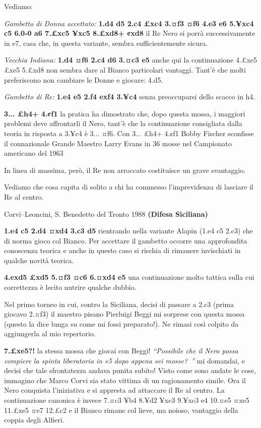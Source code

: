 Vediamo:

\emph{Gambetto di Donna accettato:} \textbf{1.d4 d5 2.c4 £xc4 3.¤f3 ¤f6
4.e3 e6 5.¥xc4 c5 6.0-0 a6 7.£xc5 ¥xc5 8.£xd8+ ¢xd8} il Re Nero si porrà
successivamente in e7, casa che, in questa variante, sembra
sufficientemente sicura.

\emph{Vecchia Indiana:} \textbf{1.d4 ¤f6 2.c4 d6 3.¤c3 e5} anche qui la
continuazione 4.£xe5 £xe5 5.£xd8 non sembra dare al Bianco particolari
vantaggi. Tant'è che molti preferiscono non cambiare le Donne e giocare:
4.d5.

\emph{Gambetto di Re:} \textbf{1.e4 e5 2.f4 exf4 3.¥c4} senza
preoccuparsi dello scacco in h4.

\textbf{3... £h4+ 4.¢f1} la pratica ha dimostrato che, dopo questa
mossa, i maggiori problemi deve affrontarli il Nero, tant'è che la
continuazione consigliata dalla teoria in risposta a 3.¥c4 è 3... ¤f6.
Con 3... £h4+ 4.¢f1 Bobby Fischer sconfisse il connazionale Grande
Maestro Larry Evans in 36 mosse nel Campionato americano del 1963

In linea di massima, però, il Re non arroccato costituisce un grave
svantaggio.

Vediamo che cosa capita di solito a chi ha commesso l'imprevidenza di
lasciare il Re al centro.

Corvi--Leoncini, S. Benedetto del Tronto 1988 \textbf{(Difesa
Siciliana)}

\textbf{1.e4 c5 2.d4 ¤xd4 3.c3 d5} rientrando nella variante Alapin
(1.e4 c5 2.c3) che di norma gioco col Bianco. Per accettare il gambetto
occorre una approfondita conoscenza teorica e anche in questo caso si
rischia di rimanere invischiati in qualche novità teorica.

\textbf{4.exd5 £xd5 5.¤f3 ¤c6 6.¤xd4 e5} una continuazione molto tattica
sulla cui correttezza è lecito nutrire qualche dubbio.

Nel primo torneo in cui, contro la Siciliana, decisi di passare a 2.c3
(prima giocavo 2.¤f3) il maestro pisano Pierluigi Beggi mi sorprese con
questa mossa (questo la dice lunga su come mi fossi preparato!). Ne
rimasi così colpito da aggiungerla al mio repertorio.

\textbf{7.£xe5?!} la stessa mossa che giocai con Beggi!
\emph{``Possibile che il Nero possa compiere la spinta liberatoria in e5
dopo appena sei mosse?~''} mi domandai, e decisi che tale sfrontatezza
andava punita subito! Visto come sono andate le cose, immagino che Marco
Corvi sia stato vittima di un ragionamento simile. Ora il Nero conquista
l'iniziativa e si appresta ad attaccare il Re al centro. La
continuazione canonica è invece 7.¤c3 ¥b4 8.¥d2 ¥xc3 9.¥xc3 e4 10.¤e5
¤xe5 11.£xe5 ¤e7 12.£c2 e il Bianco rimane col lieve, ma noioso,
vantaggio della coppia degli Alfieri.

